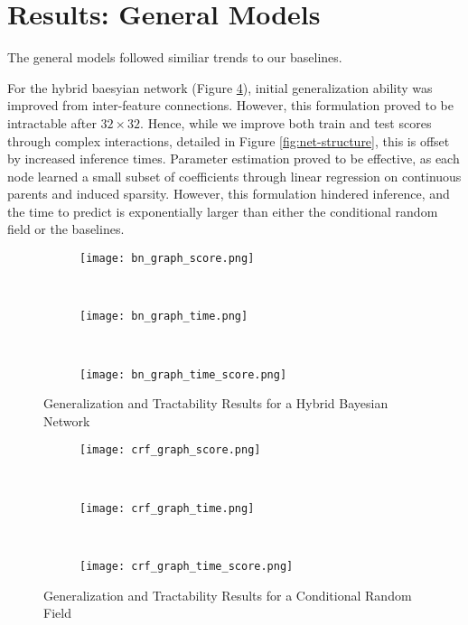 \documentclass{article}
\begin{document}

\section{Results: General Models}
\label{sec:results-general}
The general models followed similiar trends to our baselines.

For the hybrid baesyian network (Figure \ref{fig:HBN}), initial generalization
ability was improved
from inter-feature connections. However, this formulation proved to be intractable
after $32 \times 32$. Hence, while we improve both train and test scores through
complex interactions, detailed in Figure \ref{fig:net-structure}, this is
offset by increased inference times. Parameter estimation proved to be effective,
as each node learned a small subset of coefficients through linear regression
on continuous parents and induced sparsity. However, this formulation hindered
inference, and the time to predict is exponentially larger than either the
conditional random field or the baselines.

\begin{figure}
  \centering
  \begin{subfigure}[b]{0.3\textwidth}
    \centering
    \texttt{[image: bn\_graph\_score.png]}
    \caption*{}
    \label{fig:bn_graph_score}
  \end{subfigure}
  ~
  \begin{subfigure}[b]{0.3\textwidth}
    \centering
    \texttt{[image: bn\_graph\_time.png]}
    \caption*{}
    \label{fig:bn_graph_time}
  \end{subfigure}
  ~
  \begin{subfigure}[b]{0.3\textwidth}
    \centering
    \texttt{[image: bn\_graph\_time\_score.png]}
    \caption*{}
    \label{fig:bn_graph_time_score}
  \end{subfigure}
  \vspace{-10pt}
  \caption{Generalization and Tractability Results for a Hybrid Bayesian Network}
  \label{fig:HBN}
\end{figure}

\begin{figure}
  \centering
  \begin{subfigure}[b]{0.3\textwidth}
    \centering
    \texttt{[image: crf\_graph\_score.png]}
    \caption*{}
    \label{fig:crf_graph_score}
  \end{subfigure}
  ~
  \begin{subfigure}[b]{0.3\textwidth}
    \centering
    \texttt{[image: crf\_graph\_time.png]}
    \caption*{}
    \label{fig:crf_graph_time}
  \end{subfigure}
  ~
  \begin{subfigure}[b]{0.3\textwidth}
    \centering
    \texttt{[image: crf\_graph\_time\_score.png]}
    \caption*{}
    \label{fig:crf_graph_time_score}
  \end{subfigure}
  \vspace{-10pt}
  \caption{Generalization and Tractability Results for a Conditional Random Field}
  \label{fig:CRF}
\end{figure}
\end{document}
